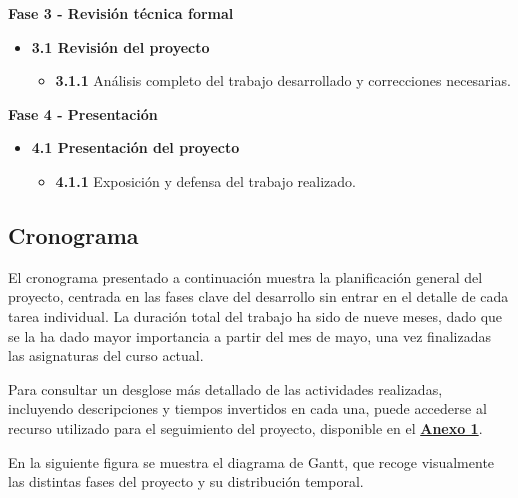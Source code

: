 \documentclass[a4paper, 11pt]{article}
\begin{document}
\vspace{0.5cm}
\textbf{\large Fase 3 - Revisión técnica formal} \vspace{0.5cm}

\begin{itemize}
    \item \textbf{3.1 Revisión del proyecto}
    \begin{itemize}
        \item \textbf{3.1.1} Análisis completo del trabajo desarrollado y correcciones necesarias.
    \end{itemize}
\end{itemize}

\vspace{0.5cm}
\textbf{\large Fase 4 - Presentación} \vspace{0.5cm}

\begin{itemize}
    \item \textbf{4.1 Presentación del proyecto}
    \begin{itemize}
        \item \textbf{4.1.1} Exposición y defensa del trabajo realizado.
    \end{itemize}
\end{itemize}


\subsection{Cronograma}
\par\vspace{0.5cm}

El cronograma presentado a continuación  muestra la planificación general del proyecto, centrada en las fases clave del desarrollo sin entrar 
en el detalle de cada tarea individual. La duración total del trabajo ha sido de nueve meses, dado que se la ha dado mayor importancia a 
partir del mes de mayo, una vez finalizadas las asignaturas del curso actual.
\par\vspace{0.5cm}
Para consultar un desglose más detallado de las actividades realizadas, incluyendo descripciones y tiempos invertidos en cada una, puede accederse al recurso utilizado para el seguimiento del proyecto, disponible en el \hyperref[anexo:1]{\textbf{Anexo 1}}.

\par\vspace{0.5cm}

En la siguiente figura se muestra el diagrama de Gantt, que recoge visualmente las distintas fases del proyecto y su distribución temporal.
\end{document}
